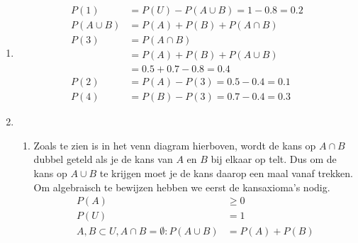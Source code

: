 \documentclass{article}
\begin{document}
\begin{enumerate}
\begin{enumerate}
        \end{enumerate}

    \item
        \begin{align*}
            P(1) &= P(U) - P(A\cup B) = 1 - 0.8 = 0.2\\
            P(A\cup B) &= P(A) + P(B) + P(A \cap B)\\
            P(3) &= P(A\cap B) \\
                 &= P(A) + P(B) + P(A\cup B)\\
                 &= 0.5 + 0.7 - 0.8 = 0.4\\
            P(2) &= P(A) - P(3) = 0.5 - 0.4 = 0.1\\
            P(4) &= P(B) - P(3) = 0.7 - 0.4 = 0.3
        \end{align*}

    \item
        \begin{enumerate}
            \item
                \begin{minipage}[t]{\linewidth}
                \end{minipage}
                Zoals te zien is in het venn diagram hierboven, wordt de kans op
                $A\cap B$ dubbel geteld als je de kans van $A$ en $B$ bij elkaar
                op telt. Dus om de kans op $A\cup B$ te krijgen moet je de kans
                daarop een maal vanaf trekken.
                Om algebraisch te bewijzen hebben we eerst de kansaxioma's
                nodig.
                \begin{align}
                    P(A) &\ge 0\\
                    P(U) &= 1 \\
                    A,B \subset U, A\cap B =\emptyset : P(A\cup B) &= P(A)+P(B)
                \end{align}


\end{enumerate}
\end{enumerate}
\end{document}

